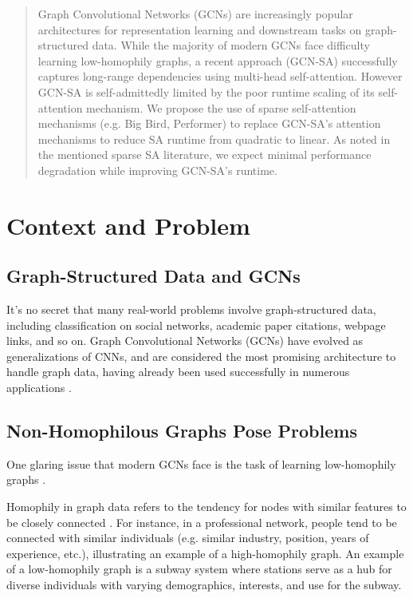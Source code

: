 \documentclass{article}
\begin{document}
\begin{abstract}
  Graph Convolutional Networks (GCNs)
  are increasingly popular architectures for 
  representation learning and downstream tasks on
  graph-structured data.
  While the majority of modern GCNs face difficulty 
  learning low-homophily graphs,
  a recent approach (GCN-SA) 
  successfully captures long-range dependencies
  using multi-head self-attention.
  However GCN-SA is self-admittedly limited by the poor
  runtime scaling of its self-attention mechanism.
  We propose the use of sparse self-attention mechanisms
  (e.g. Big Bird, Performer) to replace GCN-SA's attention
  mechanisms to
  reduce SA runtime from quadratic to linear.
  As noted in the mentioned sparse SA literature,
  we expect minimal performance degradation
  while improving GCN-SA's runtime.
\end{abstract}

\section{Context and Problem}
\label{submission}

\subsection{Graph-Structured Data and GCNs}

It's no secret that
many real-world problems involve graph-structured data,
including classification on social networks,
academic paper citations,
webpage links,
and so on.
Graph Convolutional Networks (GCNs)
have evolved as generalizations of CNNs,
and are considered the most promising
architecture to handle graph data,
having already been used successfully in numerous
applications \cite{hamilton2017representation}.

\subsection{Non-Homophilous Graphs Pose Problems}

One glaring issue that modern GCNs face is the task
of learning low-homophily graphs \cite{fan2023markov}.

Homophily in graph data refers to the tendency for nodes with
similar features to be closely connected \cite{li2023homogcl}.
For instance,
in a professional network,
people tend to be connected with similar individuals
(e.g. similar industry, position, years of experience, etc.), 
illustrating an example of a high-homophily graph.
An example of a low-homophily graph is a subway system
where stations serve as a hub for diverse individuals 
with varying demographics, interests, and use for the subway.
\end{document}
